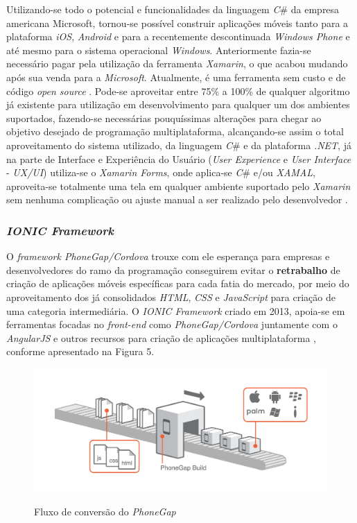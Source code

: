 Utilizando-se todo o potencial e funcionalidades da linguagem \newcommand{\Csh}{\textit{C}{\lserif\#}}\Csh{} da empresa americana Microsoft, tornou-se possível construir aplicações móveis tanto para a plataforma \textit{iOS}, \textit{Android} e para a recentemente descontinuada \textit{Windows Phone} e até mesmo para o sistema operacional \textit{Windows}. Anteriormente fazia-se necessário pagar pela utilização da ferramenta \textit{Xamarin}, o que acabou mudando após sua venda para a \textit{Microsoft}. Atualmente, é uma ferramenta sem custo e de código \textit{open source} \cite{XAMARIN2017}.
Pode-se aproveitar entre 75\% a 100\% de qualquer algoritmo já existente para utilização em desenvolvimento para qualquer um dos ambientes suportados, fazendo-se necessárias pouquíssimas alterações para chegar ao objetivo desejado de programação multiplataforma, alcançando-se assim o total aproveitamento do sistema utilizado, da linguagem \newcommand{\Csh}{\textit{C}{\lserif\#}}\Csh{} e da plataforma \textit{.NET}, já na parte de Interface e Experiência do Usuário (\textit{User Experience} e \textit{User Interface} - \textit{UX/UI}) utiliza-se o \textit{Xamarin Forms}, onde aplica-se \newcommand{\Csh}{\textit{C}{\lserif\#}}\Csh{} e/ou \textit{XAMAL}, aproveita-se totalmente uma tela em qualquer ambiente suportado pelo \textit{Xamarin} sem nenhuma complicação ou ajuste manual a ser realizado pelo desenvolvedor \cite{XAMARIN2017}.

\subsubsection{\textit{IONIC Framework}}
O \textit{framework PhoneGap/Cordova} trouxe com ele esperança para empresas e desenvolvedores do ramo da programação conseguirem evitar o \textbf{retrabalho} de criação de aplicações móveis específicas para cada fatia do mercado, por meio do aproveitamento dos já consolidados \textit{HTML}, \textit{CSS} e \textit{JavaScript} para criação de uma categoria intermediária. O \textit{IONIC Framework} criado em 2013, apoia-se em ferramentas focadas no \textit{front-end} como \textit{PhoneGap/Cordova} juntamente com o \textit{AngularJS} e outros recursos para criação de aplicações multiplataforma \cite{IONIC2017_ADRIAN_GOIS}, conforme apresentado na Figura 5. 

\FloatBarrier
\begin{figure}[!htbp]
	\centering
		\caption{Fluxo de conversão do \textit{PhoneGap}}
	\includegraphics[scale=0.4]{imagens/PHONEGAP}
	\label{fig:figura3}
\end{figure}
\FloatBarrier


